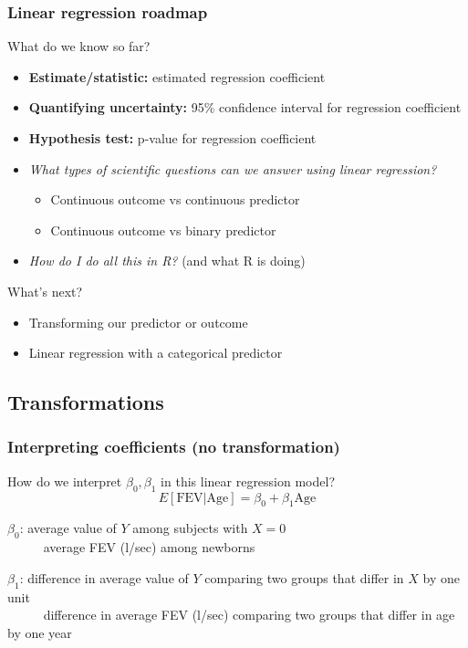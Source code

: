 \documentclass[12pt, 
hyperref={colorlinks=true, linkcolor=blue, urlcolor=cyan}]{beamer}
\begin{document}
\begin{frame}
\frametitle{Linear regression roadmap}
\color{blue} What do we know so far? \color{black}\vspace{-0.3cm}%
\begin{itemize}
\item \textbf{Estimate/statistic:} estimated regression coefficient
\item \textbf{Quantifying uncertainty:} 95\% confidence interval for regression coefficient
\item \textbf{Hypothesis test:} p-value for regression coefficient 
\item \textit{What types of scientific questions can we answer using linear regression?}
	\begin{itemize}
	\item Continuous outcome vs continuous predictor
	\item Continuous outcome vs binary predictor
	\end{itemize}
\item \textit{How do I do all this in R?} (and what R is doing)
\end{itemize}

\color{blue} What's next?\vspace{-0.3cm}
\begin{itemize}
\item Transforming our predictor or outcome
\item Linear regression with a categorical predictor
\end{itemize}
\end{frame}

\subsection{Transformations}
\begin{frame}
\frametitle{Interpreting coefficients (no transformation)}
How do we interpret $\beta_0, \beta_1$ in this linear regression model? $$E[\text{FEV}|\text{Age}] = \beta_0 + \beta_1 \text{Age}$$

$\beta_0$: average value of $Y$ among subjects with $X = 0$ \\ \pause
\ \ \ \ \ \color{blue} average FEV (l/sec) among newborns \color{black} \pause

$\beta_1$: difference in average value of $Y$ comparing two groups that differ in $X$ by one unit\\ \pause
\ \ \ \ \ \color{blue} difference in average FEV (l/sec) comparing two groups that differ in age by one year 
\end{frame}
\end{document}
